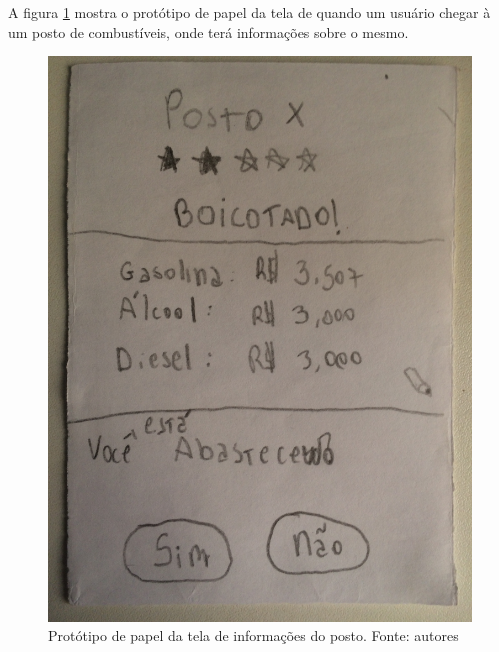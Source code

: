 A figura \ref{img:prototipo_de_papel_info_posto} mostra o protótipo de papel da tela de quando um usuário chegar à um posto de combustíveis, onde terá informações sobre o mesmo.
\begin{figure}[H]
    \centering
    \includegraphics[scale=0.1, angle=-90]{figuras/prototipo_papel_info_posto.jpg}
    \caption[Protótipo de papel da tela de informações do posto]{Protótipo de papel da tela de informações do posto. Fonte: autores}
    \label{img:prototipo_de_papel_info_posto}
\end{figure}
 \pagebreak

